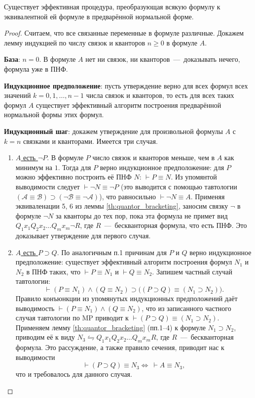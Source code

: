 \begin{lemma}
    Существует эффективная процедура, преобразующая всякую формулу к эквивалентной ей формуле в предварённой нормальной форме.
\end{lemma}
\begin{proof}
    Считаем, что все связанные переменные в формуле различные. Докажем лемму индукцией по числу связок и кванторов $n \geqslant 0$ в формуле $A$.

    \textbf{База}: $n = 0$. В формуле $A$ нет ни связок, ни кванторов~---~доказывать нечего, формула уже в ПНФ.

    \textbf{Индукционное предположение}: пусть утверждение верно для всех формул всех значений $k = 0, 1, \dots, n - 1$ числа связок и кванторов, то есть для всех таких формул $A$ существует эффективный алгоритм построения предварённой нормальной формы этих формул.

    \textbf{Индукционный шаг}: докажем утверждение для произвольной формулы $A$ с $k = n$ связками и кванторами. Имеется три случая.
    \begin{enumerate}
        \item \underline{$A$ есть $\neg P$}. В формуле $P$ число связок и кванторов меньше, чем в $A$ как минимум на $1$. Тогда для $P$ верно индукционное предположение: для $P$ можно эффективно построить её ПНФ $N$: $\vdash P \equiv N$. Из упомянтой выводимости следует $\vdash \neg N \equiv \neg P$ (это выводится с помощью тавтологии $(\mathcal{A} \equiv \mathcal{B}) \supset (\neg\mathcal{B} \equiv \neg\mathcal{A})$), что равносильно $\vdash \neg N \equiv A$. Применяя эквиваленации 5, 6 из леммы \ref{th:quantor_bracketing}, заносим связку $\neg$ в формуле $\neg N$ за кванторы до тех пор, пока эта формула не примет вид $Q_1x_1Q_2x_2\dots Q_mx_m\neg R$, где $R$~---~бескванторная формула, что есть ПНФ. Это доказывает утверждение для первого случая.
        
        \item \underline{$A$ есть $P \supset Q$}. По аналогичным п.1 причинам для $P$ и $Q$ верно индукционное предположение: существует эффективный алгоритм построения формул $N_1$ и $N_2$ в ПНФ таких, что $\vdash P \equiv N_1$ и $\vdash Q \equiv N_2$. Запишем частный случай тавтологии:
        \[
            \vdash (P \equiv N_1) \land (Q \equiv N_2) \supset \big((P \supset Q) \equiv (N_1 \supset N_2)\big).
        \]
        Правило конъюнкции из упомянутых индукционных предположений даёт выводимость $\vdash (P \equiv N_1) \land (Q \equiv N_2)$, что из записанного частного случая тавтологии по MP приводит к $\vdash (P \supset Q) \equiv (N_1 \supset N_2)$. Применяем лемму \ref{th:quantor_bracketing} (пп.1--4) к формуле $N_1 \supset N_2$, приводим её к виду $N_3 \leftrightharpoons Q_1x_1Q_2x_2\dots Q_mx_mR$, где $R$~---~бескванторная формула. Это рассуждение, а также правило сечения, приводит нас к выводимости 
        \[
            \vdash (P \supset Q) \equiv N_3 \Longleftrightarrow\ \vdash A \equiv N_3,
        \]
        что и требовалось для данного случая.


\end{enumerate}
\end{proof}
